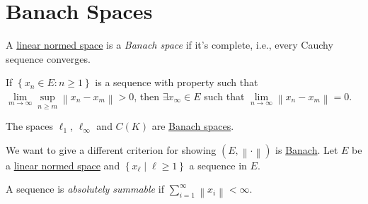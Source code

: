 \section{Banach Spaces}
\begin{definition}\label{def:Banach-space}
	A \hyperref[def:normed-vector-space]{linear normed space} is a \emph{Banach space} if it's complete, i.e., every Cauchy sequence converges.
\end{definition}

\begin{note}
	If \(\left\{ x_n\in E\colon n \geq 1 \right\}\) is a sequence with property such that \(\lim\limits_{m \to \infty} \sup\limits_{n\geq m} \left\lVert x_n - x_m\right\rVert > 0 \), then \(\exists x_{\infty }\in E\) such that \(\lim\limits_{n \to \infty} \left\lVert x_n - x_m\right\rVert = 0\).
\end{note}

\begin{eg}
	The spaces \(\ell _1\), \(\ell _{\infty }\) and \(C(K)\) are \hyperref[def:Banach-space]{Banach spaces}.
\end{eg}

We want to give a different criterion for showing \((E, \left\lVert \cdot\right\rVert)\) is \hyperref[def:Banach-space]{Banach}. Let \(E\) be a \hyperref[def:normed-vector-space]{linear normed space} and \(\left\{ x_{\ell } \mid \ell \geq 1 \right\} \) a sequence in \(E\).

\begin{definition}\label{def:absolutely-summable}
	A sequence is \emph{absolutely summable} if \(\sum_{i=1}^{\infty} \left\lVert x_i\right\rVert < \infty \).
\end{definition}

